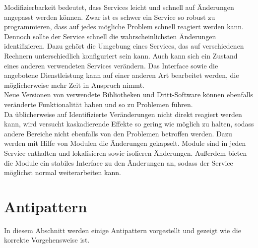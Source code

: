 Modifizierbarkeit bedeutet, dass Services leicht und schnell auf Änderungen angepasst werden können. Zwar ist es schwer ein Service so robust zu programmieren, dass auf jedes mögliche Problem schnell reagiert werden kann. Dennoch sollte der Service schnell die wahrscheinlichsten Änderungen identifizieren. Dazu gehört die Umgebung eines Services, das auf verschiedenen Rechnern unterschiedlich konfiguriert sein kann. Auch kann sich ein Zustand eines anderen verwendeten Services verändern. Das Interface sowie die angebotene Dienstleistung kann auf einer anderen Art bearbeitet werden, die möglicherweise mehr Zeit in Anspruch nimmt.\\
Neue Versionen von verwendete Bibliotheken und Dritt-Software können ebenfalls veränderte Funktionalität haben und so zu Problemen führen.\\
Da üblicherweise auf Identifizierte Veränderungen nicht direkt reagiert werden kann, wird versucht kaskadierende Effekte so gering wie möglich zu halten, sodass andere Bereiche nicht ebenfalls von den Problemen betroffen werden. Dazu werden mit Hilfe von Modulen die Änderungen gekapselt. Module sind in jeden Service enthalten und lokalisieren sowie isolieren Änderungen. Außerdem bieten die Module ein stabiles Interface zu den Änderungen an, sodass der Service möglichst normal weiterarbeiten kann. 

\section{Antipattern}

In diesem Abschnitt werden einige Antipattern vorgestellt und gezeigt wie die korrekte Vorgehensweise ist.

